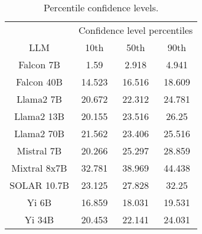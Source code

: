 \begin{table*}
\centering
\begin{tabular}{c|c|c|c}
& \multicolumn{3}{c}{Confidence level percentiles} \\ 
LLM & 10th & 50th & 90th\\ \hline
Falcon 7B & 1.59 & 2.918 & 4.941\\
Falcon 40B & 14.523 & 16.516 & 18.609\\
Llama2 7B & 20.672 & 22.312 & 24.781\\
Llama2 13B & 20.155 & 23.516 & 26.25\\
Llama2 70B & 21.562 & 23.406 & 25.516\\
Mistral 7B & 20.266 & 25.297 & 28.859\\
Mixtral 8x7B & 32.781 & 38.969 & 44.438\\
SOLAR 10.7B & 23.125 & 27.828 & 32.25\\
Yi 6B & 16.859 & 18.031 & 19.531\\
Yi 34B & 20.453 & 22.141 & 24.031\\
\hline
\end{tabular}
\caption{Percentile confidence levels.}
\label{tab:percentile_conf}
\end{table*}
